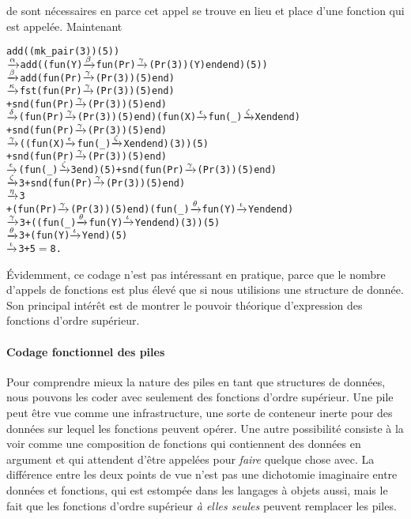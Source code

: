 de  sont nécessaires en \Erlang parce cet appel se
trouve en lieu et place d'une fonction qui est appelée. Maintenant
\begin{alltt}
add((mk\_pair(3))(5))
  \(\smashedrightarrow{\alpha}\) add((fun(Y) \(\smashedrightarrow{\beta}\) fun(Pr) \(\smashedrightarrow{\gamma}\) (Pr(3))(Y) end end)(5))
  \(\smashedrightarrow{\beta}\) add(fun(Pr) \(\smashedrightarrow{\gamma}\) (Pr(3))(5) end)
  \(\smashedrightarrow{\kappa}\)   fst(fun(Pr) \(\smashedrightarrow{\gamma}\) (Pr(3))(5) end)
     + snd(fun(Pr) \(\smashedrightarrow{\gamma}\) (Pr(3))(5) end)
  \(\smashedrightarrow{\delta}\)   (fun(Pr)\(\smashedrightarrow{\gamma}\)(Pr(3))(5) end)(fun(X)\(\smashedrightarrow{\epsilon}\)fun(_)\(\smashedrightarrow{\zeta}\)X end end)
     + snd(fun(Pr) \(\smashedrightarrow{\gamma}\) (Pr(3))(5) end)
  \(\smashedrightarrow{\gamma}\)   ((fun(X) \(\smashedrightarrow{\epsilon}\) fun(\_) \(\smashedrightarrow{\zeta}\) X end end)(3))(5)
     + snd(fun(Pr) \(\smashedrightarrow{\gamma}\) (Pr(3))(5) end)
  \(\smashedrightarrow{\epsilon}\) (fun(\_) \(\smashedrightarrow{\zeta}\) 3 end)(5) + snd(fun(Pr) \(\smashedrightarrow{\gamma}\) (Pr(3))(5) end)
  \(\smashedrightarrow{\zeta}\) 3 + snd(fun(Pr) \(\smashedrightarrow{\gamma}\) (Pr(3))(5) end)
  \(\smashedrightarrow{\eta}\) 3
     + (fun(Pr)\(\smashedrightarrow{\gamma}\)(Pr(3))(5) end)(fun(\_)\(\smashedrightarrow{\theta}\)fun(Y)\(\smashedrightarrow{\iota}\)Y end end)
  \(\smashedrightarrow{\gamma}\) 3 + ((fun(\_) \(\smashedrightarrow{\theta}\) fun(Y) \(\smashedrightarrow{\iota}\) Y end end)(3))(5)
  \(\smashedrightarrow{\theta}\) 3 + (fun(Y) \(\smashedrightarrow{\iota}\) Y end)(5)
  \(\smashedrightarrow{\iota}\) 3 + 5 \(=\) 8.
\end{alltt}
Évidemment, ce codage n'est pas intéressant en pratique, parce que le
nombre d'appels de fonctions est plus élevé que si nous utilisions une
structure de donnée. Son principal intérêt est de montrer le pouvoir
théorique d'expression des fonctions d'ordre supérieur.

\paragraph{Codage fonctionnel des piles}

Pour comprendre mieux la nature des piles en tant que structures de
données, nous pouvons les coder avec seulement des fonctions d'ordre
supérieur. Une pile peut être vue comme une infrastructure, une sorte
de conteneur inerte pour des données sur lequel les fonctions peuvent
opérer. Une autre possibilité consiste à la voir comme une composition
de fonctions qui contiennent des données en argument et qui attendent
d'être appelées pour \emph{faire} quelque chose avec. La différence
entre les deux points de vue n'est pas une dichotomie imaginaire entre
données et fonctions, qui est estompée dans les langages à objets
aussi, mais le fait que les fonctions d'ordre supérieur \emph{à elles
  seules} peuvent remplacer les piles.

